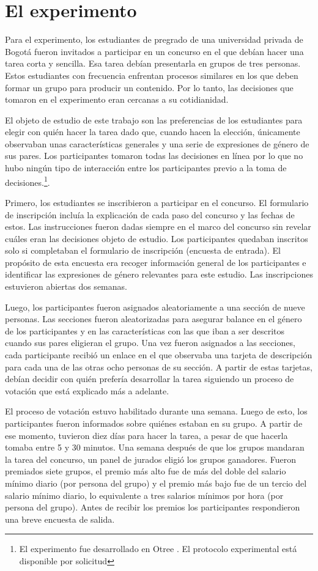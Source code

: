 \section{El experimento}
Para el experimento, los estudiantes de pregrado de una universidad privada de Bogotá fueron invitados a participar en un concurso en el que debían hacer una tarea corta y sencilla. Esa tarea debían presentarla en grupos de tres personas. Estos estudiantes con frecuencia enfrentan procesos similares en los que deben formar un grupo para producir un contenido. Por lo tanto, las decisiones que tomaron en el experimento eran cercanas a su cotidianidad. 

El objeto de estudio de este trabajo son las preferencias de los estudiantes para elegir con quién hacer la tarea dado que, cuando hacen la elección, únicamente observaban unas características generales y una serie de expresiones de género de sus pares.  Los participantes tomaron todas las decisiones en línea por lo que no hubo ningún tipo de interacción entre los participantes previo a la toma de decisiones.\footnote{El experimento fue desarrollado en Otree \citep{otree}. El protocolo experimental está disponible por solicitud}.

Primero, los estudiantes se inscribieron a participar en el concurso. El formulario de inscripción incluía la explicación de cada paso del concurso y las fechas de estos. Las instrucciones fueron dadas siempre en el marco del concurso sin revelar cuáles eran las decisiones objeto de estudio. Los participantes quedaban inscritos solo si completaban el formulario de inscripción (encuesta de entrada). El propósito de esta encuesta era recoger información general de los participantes e identificar las expresiones de género relevantes para este estudio. Las inscripciones estuvieron abiertas dos semanas.

Luego, los participantes fueron asignados aleatoriamente a una sección de nueve personas. Las secciones fueron aleatorizadas para asegurar balance en el género de los participantes y en las características con las que iban a ser descritos cuando sus pares eligieran el grupo. Una vez fueron asignados a las secciones, cada participante recibió un enlace en el que observaba una tarjeta de descripción para cada una de las otras ocho personas de su sección. A partir de estas tarjetas, debían decidir con quién prefería desarrollar la tarea siguiendo un proceso de votación que está explicado más a adelante. 

El proceso de votación estuvo habilitado durante una semana. Luego de esto, los participantes fueron informados sobre quiénes estaban en su grupo. A partir de ese momento, tuvieron diez días para hacer la tarea, a pesar de que hacerla tomaba entre 5 y 30 minutos. Una semana después de que los grupos mandaran la tarea del concurso, un panel de jurados eligió los grupos ganadores. Fueron premiados siete grupos, el premio más alto fue de más del doble del salario mínimo diario (por persona del grupo) y el premio más bajo fue de un tercio del salario mínimo diario, lo equivalente a tres salarios mínimos por hora (por persona del grupo). Antes de recibir los premios los participantes respondieron una breve encuesta de salida.


